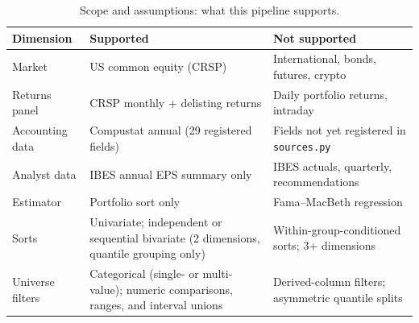 \begin{table}[htbp]
  \centering
  \caption{Scope and assumptions: what this pipeline supports.}
  \label{tab:scope}
  \begin{tabular}{@{}p{2.6cm}>{\raggedright\arraybackslash}p{6.3cm}>{\raggedright\arraybackslash}p{6.3cm}@{}}
    \toprule
    Dimension & Supported & Not supported \\
    \midrule
    Market & US common equity (CRSP) & International, bonds, futures, crypto \\
    \addlinespace
    Returns panel & CRSP monthly + delisting returns & Daily portfolio returns, intraday \\
    \addlinespace
    Accounting data & Compustat annual (29 registered fields) & Fields not yet registered in \texttt{sources.py} \\
    \addlinespace
    Analyst data & IBES annual EPS summary only & IBES actuals, quarterly, recommendations \\
    \addlinespace
    Estimator & Portfolio sort only & Fama--MacBeth regression \\
    \addlinespace
    Sorts & Univariate; independent or sequential bivariate (2 dimensions, quantile grouping only) & Within-group-conditioned sorts; 3+ dimensions \\
    \addlinespace
    Universe filters & Categorical (single- or multi-value); numeric comparisons, ranges, and interval unions & Derived-column filters; asymmetric quantile splits \\
    \bottomrule
  \end{tabular}
\end{table}

